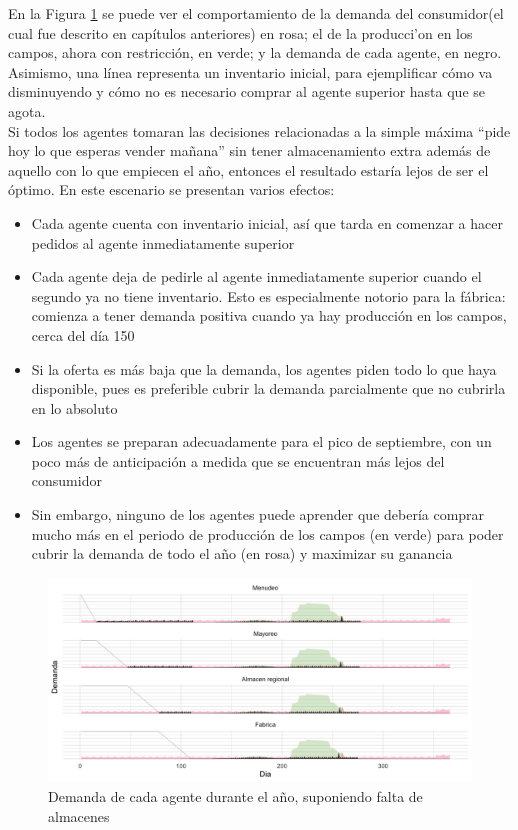 En la Figura \ref{analytic_3} se puede ver el comportamiento de la demanda del consumidor(el cual fue descrito en cap\'itulos anteriores) en rosa; el de la producci'on en los campos, ahora con restricci\'on, en verde; y la demanda de cada agente, en negro. Asimismo, una l\'inea representa un inventario inicial, para ejemplificar c\'omo va disminuyendo y c\'omo no es necesario comprar al agente superior hasta que se agota.\\

Si todos los agentes tomaran las decisiones relacionadas a la simple m\'axima ``pide hoy lo que esperas vender ma\~nana'' sin tener almacenamiento extra adem\'as de aquello con lo que empiecen el a\~no, entonces el resultado estar\'ia lejos de ser el \'optimo. En este escenario se presentan varios efectos: 
\begin{itemize}
    \item Cada agente cuenta con inventario inicial, as\'i que tarda en comenzar a hacer pedidos al agente inmediatamente superior
    \item Cada agente deja de pedirle al agente inmediatamente superior cuando el segundo ya no tiene inventario. Esto es especialmente notorio para la f\'abrica: comienza a tener demanda positiva cuando ya hay producci\'on en los campos, cerca del d\'ia 150
    \item Si la oferta es m\'as baja que la demanda, los agentes piden todo lo que haya disponible, pues es preferible cubrir la demanda parcialmente que no cubrirla en lo absoluto
    \item Los agentes se preparan adecuadamente para el pico de septiembre, con un poco m\'as de anticipaci\'on a medida que se encuentran m\'as lejos del consumidor
    \item Sin embargo, ninguno de los agentes puede aprender que deber\'ia comprar mucho m\'as en el periodo de producci\'on de los campos (en verde) para poder cubrir la demanda de todo el a\~no (en rosa) y maximizar su ganancia
\end{itemize}

\begin{figure}[ht!]
\caption{Demanda de cada agente durante el a\~no, suponiendo falta de almacenes}
\label{analytic_3}
\includegraphics[width=16cm]{tesis_tex/figs/analytic_with_fields_restriction.png}
\centering
\end{figure}

